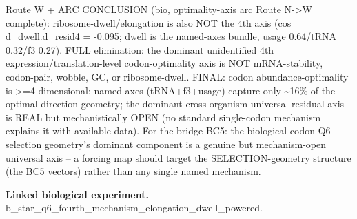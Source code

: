 Route W + ARC CONCLUSION (bio, optimality-axis arc Route N->W complete): ribosome-dwell/elongation
is also NOT the 4th axis (cos d\_dwell.d\_resid4 = -0.095; dwell is the named-axes bundle, usage
0.64/tRNA 0.32/f3 0.27). FULL elimination: the dominant unidentified 4th
expression/translation-level codon-optimality axis is NOT mRNA-stability, codon-pair, wobble, GC, or
ribosome-dwell. FINAL: codon abundance-optimality is >=4-dimensional; named axes (tRNA+f3+usage)
capture only \textasciitilde{}16\% of the optimal-direction geometry; the dominant
cross-organism-universal residual axis is REAL but mechanistically OPEN (no standard single-codon
mechanism explains it with available data). For the bridge BC5: the biological codon-Q6 selection
geometry's dominant component is a genuine but mechanism-open universal axis -- a forcing map should
target the SELECTION-geometry structure (the BC5 vectors) rather than any single named mechanism.

\textbf{Linked biological experiment.} b\_star\_q6\_fourth\_mechanism\_elongation\_dwell\_powered.
